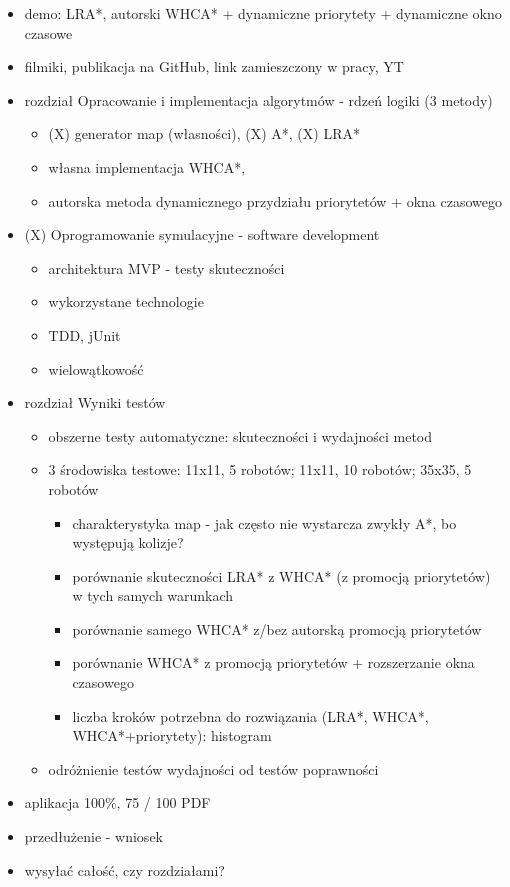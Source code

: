 \begin{itemize}
	\item demo: LRA*, autorski WHCA* + dynamiczne priorytety + dynamiczne okno czasowe
	\item filmiki, publikacja na GitHub, link zamieszczony w pracy, YT
	\item rozdział Opracowanie i implementacja algorytmów - rdzeń logiki (3 metody)
	\begin{itemize}
		\item (X) generator map (własności), (X) A*, (X) LRA*
		\item własna implementacja WHCA*,
		\item autorska metoda dynamicznego przydziału priorytetów + okna czasowego
	\end{itemize}
	\item (X) Oprogramowanie symulacyjne - software development
	\begin{itemize}
		\item architektura MVP - testy skuteczności
		\item wykorzystane technologie
		\item TDD, jUnit
		\item wielowątkowość
	\end{itemize}
	\item rozdział Wyniki testów
	\begin{itemize}
		\item obszerne testy automatyczne: skuteczności i wydajności metod
		\item 3 środowiska testowe: 11x11, 5 robotów; 11x11, 10 robotów; 35x35, 5 robotów
		\begin{itemize}
			\item charakterystyka map - jak często nie wystarcza zwykły A*, bo występują kolizje?
			\item porównanie skuteczności LRA* z WHCA* (z promocją priorytetów) w tych samych warunkach
			\item porównanie samego WHCA* z/bez autorską promocją priorytetów
			\item porównanie WHCA* z promocją priorytetów + rozszerzanie okna czasowego
			\item liczba kroków potrzebna do rozwiązania (LRA*, WHCA*, WHCA*+priorytety): histogram
		\end{itemize}
		\item odróżnienie testów wydajności od testów poprawności
	\end{itemize}
	\item aplikacja 100\%, 75 / 100 PDF
	\item przedłużenie - wniosek
	\item wysyłać całość, czy rozdziałami?
\end{itemize}